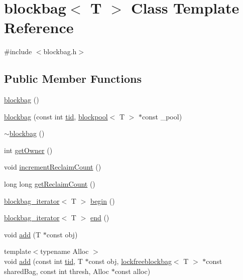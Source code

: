 \hypertarget{classblockbag}{}\section{blockbag$<$ T $>$ Class Template Reference}
\label{classblockbag}


{\ttfamily \#include $<$blockbag.\+h$>$}

\subsection*{Public Member Functions}
\begin{DoxyCompactItemize}
\item 
\hyperlink{classblockbag_ad9443345e870e2faf375d14e1600918f}{blockbag} ()
\item 
\hyperlink{classblockbag_a2b387e4ba02e7c1dc9bbba8056a78ab3}{blockbag} (const int \hyperlink{microbench_2main_8cpp_a9ca9869868fe7e7a38a921cc7de4103f}{tid}, \hyperlink{classblockpool}{blockpool}$<$ T $>$ $\ast$const \+\_\+pool)
\item 
\hyperlink{classblockbag_a9353b0797054b55ab1032912718c25ee}{$\sim$blockbag} ()
\item 
int \hyperlink{classblockbag_ada8476d80376cec8051d5cba57d99d4f}{get\+Owner} ()
\item 
void \hyperlink{classblockbag_a660dcb368b89a1d6a96cf7d9bc0bf11d}{increment\+Reclaim\+Count} ()
\item 
long long \hyperlink{classblockbag_a43feda8d7817bfb6a857f83bf02a5edb}{get\+Reclaim\+Count} ()
\item 
\hyperlink{classblockbag__iterator}{blockbag\+\_\+iterator}$<$ T $>$ \hyperlink{classblockbag_a8f600e6e4330a864d36572a3adaf387e}{begin} ()
\item 
\hyperlink{classblockbag__iterator}{blockbag\+\_\+iterator}$<$ T $>$ \hyperlink{classblockbag_a2b8c14d976119bb688ead024cd90fc16}{end} ()
\item 
void \hyperlink{classblockbag_a8cb3c434b92a6e58a47bc235d0c2a91c}{add} (T $\ast$const obj)
\item 
{\footnotesize template$<$typename Alloc $>$ }\\void \hyperlink{classblockbag_a4ae5f3f6ef5fd7d458abf39aae9c9b75}{add} (const int \hyperlink{microbench_2main_8cpp_a9ca9869868fe7e7a38a921cc7de4103f}{tid}, T $\ast$const obj, \hyperlink{classlockfreeblockbag}{lockfreeblockbag}$<$ T $>$ $\ast$const shared\+Bag, const int thresh, Alloc $\ast$const alloc)
\item 

\end{DoxyCompactItemize}
